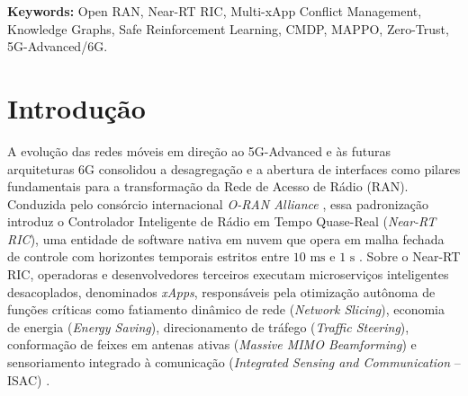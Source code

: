 \documentclass[12pt]{article}
\begin{document}
\noindent \textbf{Keywords:} Open RAN, Near-RT RIC, Multi-xApp Conflict Management, Knowledge Graphs, Safe Reinforcement Learning, CMDP, MAPPO, Zero-Trust, 5G-Advanced/6G.

\section{Introdução}
\label{sec:introducao}

A evolução das redes móveis em direção ao 5G-Advanced e às futuras arquiteturas 6G consolidou a desagregação e a abertura de interfaces como pilares fundamentais para a transformação da Rede de Acesso de Rádio (RAN). Conduzida pelo consórcio internacional \textit{O-RAN Alliance} \cite{oran_wg1_arch}, essa padronização introduz o Controlador Inteligente de Rádio em Tempo Quase-Real (\textit{Near-RT RIC}), uma entidade de software nativa em nuvem que opera em malha fechada de controle com horizontes temporais estritos entre $10\text{ ms}$ e $1\text{ s}$ \cite{oran_wg3_ric, polese2023nsoran}. Sobre o Near-RT RIC, operadoras e desenvolvedores terceiros executam microserviços inteligentes desacoplados, denominados \textit{xApps}, responsáveis pela otimização autônoma de funções críticas como fatiamento dinâmico de rede (\textit{Network Slicing}), economia de energia (\textit{Energy Saving}), direcionamento de tráfego (\textit{Traffic Steering}), conformação de feixes em antenas ativas (\textit{Massive MIMO Beamforming}) e sensoriamento integrado à comunicação (\textit{Integrated Sensing and Communication} -- ISAC) \cite{bonati2023openran, lacava2023programmable, cui2021isac}.
\end{document}
